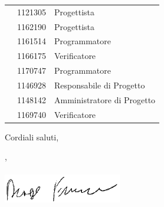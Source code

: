 \documentclass[12pt]{letter}
\begin{document}
\begin{letter}
{\begin{longtable}{ C{4cm} C{3cm} C{6cm} }
                \MC{} & 1121305 & Progettista \\
                \LD{} & 1162190 & Progettista \\
                \CE{} & 1161514 & Programmatore \\
                \SE{} & 1166175 & Verificatore \\
                \PF{} & 1170747 & Programmatore \\
                \DF{} & 1146928 & Responsabile di Progetto \\
                \BR{} & 1148142 & Amministratore di Progetto \\
                \AT{} & 1169740 & Verificatore \\  
            \end{longtable}
        }
        Cordiali saluti,
        \closing{\DF{}, \\ \textit{\Responsabile{}}\\ \includegraphics[width=.6\linewidth]{../DocumentazioneEsterna/PianoDiProgetto/Sezioni/Immagini/Firme/Francesco.png}}
        \vspace{10mm}
    \end{letter}
\end{document}
